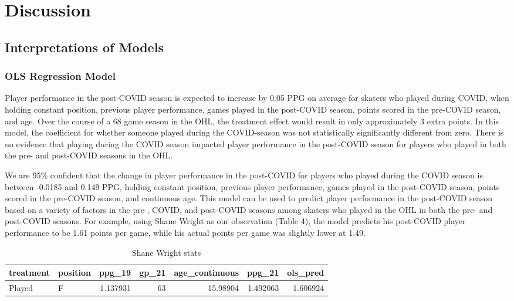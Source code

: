 \documentclass[12pt]{article}
\begin{document}
\hypertarget{discussion}{%
\section{Discussion}\label{discussion}}

\hypertarget{interpretations-of-models}{%
\subsection{Interpretations of Models}\label{interpretations-of-models}}

\hypertarget{ols-regression-model}{%
\subsubsection{OLS Regression Model}\label{ols-regression-model}}

Player performance in the post-COVID season is expected to increase by
0.05 PPG on average for skaters who played during COVID, when holding
constant position, previous player performance, games played in the
post-COVID season, points scored in the pre-COVID season, and age. Over
the course of a 68 game season in the OHL, the treatment effect would
result in only approximately 3 extra points. In this model, the
coefficient for whether someone played during the COVID-season was not
statistically significantly different from zero. There is no evidence
that playing during the COVID season impacted player performance in the
post-COVID season for players who played in both the pre- and post-COVID
seasons in the OHL.

We are 95\% confident that the change in player performance in the
post-COVID for players who played during the COVID season is between
-0.0185 and 0.149 PPG, holding constant position, previous player
performance, games played in the post-COVID season, points scored in the
pre-COVID season, and continuous age. This model can be used to predict
player performance in the post-COVID season based on a variety of
factors in the pre-, COVID, and post-COVID seasons among skaters who
played in the OHL in both the pre- and post-COVID seasons. For example,
using Shane Wright as our observation (Table 4), the model predicts his
post-COVID player performance to be 1.61 points per game, while his
actual points per game was slightly lower at 1.49.

\begin{table}
\caption{\label{Table 4.}Shane Wright stats}
\centering
\begin{tabular}{l|l|r|r|r|r|r}
\hline
treatment & position & ppg\_19 & gp\_21 & age\_continuous & ppg\_21 & ols\_pred\\
\hline
Played & F & 1.137931 & 63 & 15.98904 & 1.492063 & 1.606924\\
\hline
\end{tabular}
\end{table}
\end{document}
